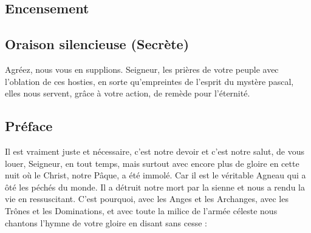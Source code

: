 \documentclass[%
fontsize=11%
,a5paper%
,DIV=15%
]{scrartcl}
\begin{document}
\subsection*{Encensement}


\subsection*{%
Oraison silencieuse (Secrète)%
}
Agréez, nous vous en supplions. Seigneur, les prières de votre peuple avec l’oblation de ces hosties, en sorte qu’empreintes de l’esprit du mystère pascal, elles nous servent, grâce à votre action, de remède pour l’éternité.


\subsection*{%
Préface%
}








Il est vraiment juste et nécessaire,
c’est notre devoir et c’est notre salut,
de vous louer, Seigneur, en tout temps,
mais surtout avec encore plus de gloire en cette nuit
où le Christ, notre Pâque, a été immolé.
Car il est le véritable Agneau
qui a ôté les péchés du monde.
Il a détruit notre mort par la sienne
et nous a rendu la vie en ressuscitant.
C’est pourquoi, avec les Anges et les Archanges,
avec les Trônes et les Dominations,
et avec toute la milice de l’armée céleste
nous chantons l’hymne de votre gloire
en disant sans cesse :
\end{document}
